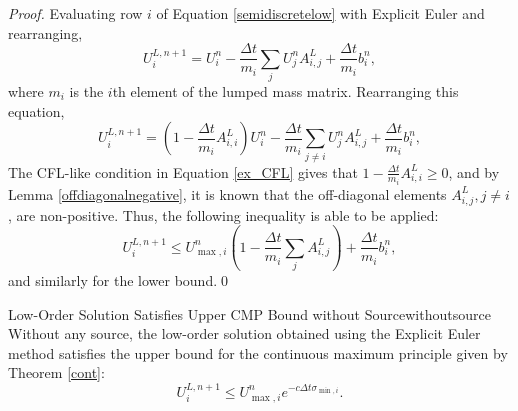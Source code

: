 \begin{proof}
Evaluating row $i$ of Equation \eqref{semidiscretelow} with Explicit Euler
and rearranging,
\[
   U_i^{L,n+1} = U_i^n - \frac{\Delta t}{m_i}\sum\limits_j U_j^n A^L_{i,j}
      + \frac{\Delta t}{m_i}b_i^n,
\]
where $m_i$ is the $i$th element of the lumped mass matrix.
Rearranging this equation,
\[
   U_i^{L,n+1} = \left(1-\frac{\Delta t}{m_i}A^L_{i,i}\right)U_i^n - \frac{\Delta t}{m_i}
      \sum\limits_{j\ne i} U_j^n A^L_{i,j} + \frac{\Delta t}{m_i}b_i^n,
\]
The CFL-like condition in Equation \eqref{ex_CFL} gives that $1-\frac{\Delta t}{m_i}A^L_{i,i} \ge 0$, and by
Lemma \ref{offdiagonalnegative}, it is known that the off-diagonal
elements $A^L_{i,j}, j\ne i$, are non-positive. Thus, the following inequality is
able to be applied:
\[
   U_i^{L,n+1} \le
   U_{\max,i}^n\left(1-\frac{\Delta t}{m_i}\sum\limits_j A^L_{i,j}\right)
      + \frac{\Delta t}{m_i}b_i^n,
\]
and similarly for the lower bound.\qed
\end{proof}
\begin{corollary}{Low-Order Solution Satisfies Upper CMP Bound without Source}{withoutsource}
   Without any source, the low-order solution obtained using the Explicit Euler
   method satisfies the upper bound
   for the continuous maximum principle given by Theorem \ref{cont}:
   \begin{equation}\label{loworderDMP}
      U_i^{L,n+1} \le
      U_{\max,i}^n e^{-c\Delta t\sigma_{\min,i}}.
   \end{equation}
\end{corollary}

